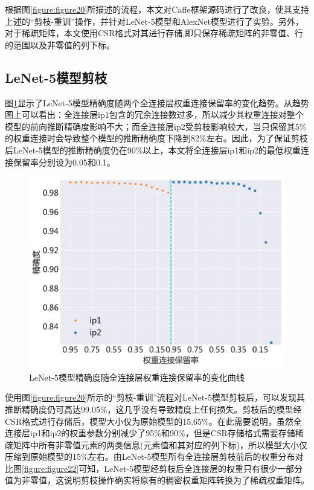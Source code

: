 根据图\ref{figure:figure20}所描述的流程，本文对Caffe框架源码进行了改良，使其支持上述的“剪枝-重训”操作，并针对LeNet-5模型和AlexNet模型进行了实验。另外，对于稀疏矩阵，本文使用CSR格式对其进行存储,即只保存稀疏矩阵的非零值、行的范围以及非零值的列下标。

\subsection{LeNet-5模型剪枝}

图\ref{figure:figure21}显示了LeNet-5模型精确度随两个全连接层权重连接保留率的变化趋势。从趋势图上可以看出：全连接层ip1包含的冗余连接数过多，所以减少其权重连接对整个模型的前向推断精确度影响不大；而全连接层ip2受剪枝影响较大，当只保留其5\%的权重连接时会导致整个模型的推断精确度下降到82\%左右。因此，为了保证剪枝后LeNet-5模型的推断精确度仍在90\%以上，本文将全连接层ip1和ip2的最低权重连接保留率分别设为0.05和0.1。

\begin{figure}[htbp]
    \centering
    \includegraphics[height=0.45\textwidth]{figures/lenet_pruned_threshold.pdf}
    \caption{LeNet-5模型精确度随全连接层权重连接保留率的变化曲线}\label{figure:figure21}
\end{figure}

使用图\ref{figure:figure20}所示的“剪枝-重训”流程对LeNet-5模型剪枝后，可以发现其推断精确度仍可高达99.05\%，这几乎没有导致精度上任何损失。剪枝后的模型经CSR格式进行存储后，模型大小仅为原始模型的15.65\%。在此需要说明，虽然全连接层ip1和ip2的权重参数分别减少了95\%和90\%，但是CSR存储格式需要存储稀疏矩阵中所有非零值元素的两类信息(元素值和其对应的列下标)，所以模型大小仅压缩到原始模型的15\%左右。由LeNet-5模型所有全连接层剪枝前后的权重分布对比图\ref{figure:figure22}可知，LeNet-5模型经剪枝后全连接层的权重只有很少一部分值为非零值，这说明剪枝操作确实将原有的稠密权重矩阵转换为了稀疏权重矩阵。

